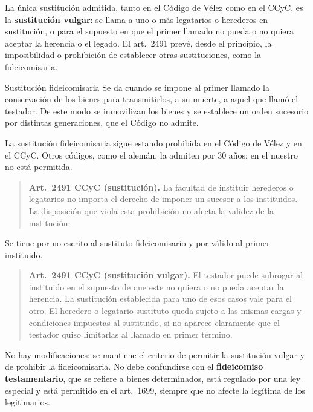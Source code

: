 \documentclass[12pt,oneside]{book}
\begin{document}
La única sustitución admitida, tanto en el Código de Vélez como en el CCyC, es la \textbf{sustitución vulgar}: se llama a uno o más legatarios o herederos en sustitución, o para el supuesto en que el primer llamado no pueda o no quiera aceptar la herencia o el legado. El art.~2491 prevé, desde el principio, la imposibilidad o prohibición de establecer otras sustituciones, como la fideicomisaria.

\begin{definition}{Sustitución fideicomisaria}
Se da cuando se impone al primer llamado la conservación de los bienes para transmitirlos, a su muerte, a aquel que llamó el testador. De este modo se inmovilizan los bienes y se establece un orden sucesorio por distintas generaciones, que el Código no admite.
\end{definition}

\begin{important}
La sustitución fideicomisaria sigue estando prohibida en el Código de Vélez y en el CCyC. Otros códigos, como el alemán, la admiten por 30 años; en el nuestro no está permitida.
\end{important}

\begin{quote}
\textbf{Art.~2491 CCyC (sustitución).} La facultad de instituir herederos o legatarios no importa el derecho de imponer un sucesor a los instituidos. La disposición que viola esta prohibición no afecta la validez de la institución.
\end{quote}

Se tiene por no escrito al sustituto fideicomisario y por válido al primer instituido.

\begin{quote}
\textbf{Art.~2491 CCyC (sustitución vulgar).} El testador puede subrogar al instituido en el supuesto de que este no quiera o no pueda aceptar la herencia. La sustitución establecida para uno de esos casos vale para el otro. El heredero o legatario sustituto queda sujeto a las mismas cargas y condiciones impuestas al sustituido, si no aparece claramente que el testador quiso limitarlas al llamado en primer término.
\end{quote}

No hay modificaciones: se mantiene el criterio de permitir la sustitución vulgar y de prohibir la fideicomisaria. No debe confundirse con el \textbf{fideicomiso testamentario}, que se refiere a bienes determinados, está regulado por una ley especial y está permitido en el art.~1699, siempre que no afecte la legítima de los legitimarios.
\end{document}
